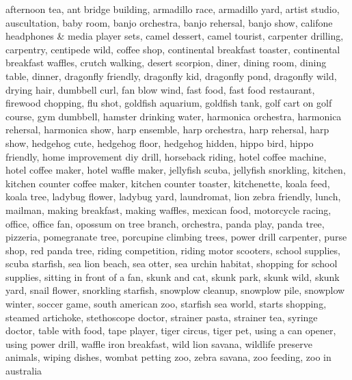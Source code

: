 \begin{appendices}
{\noindent 
afternoon tea, ant bridge building, armadillo race, armadillo yard, artist studio, auscultation, baby room, banjo orchestra, banjo rehersal, banjo show, califone headphones \& media player sets, camel dessert, camel tourist, carpenter drilling, carpentry, centipede wild, coffee shop, continental breakfast toaster, continental breakfast waffles, crutch walking, desert scorpion, diner, dining room, dining table, dinner, dragonfly friendly, dragonfly kid, dragonfly pond, dragonfly wild, drying hair, dumbbell curl, fan blow wind, fast food, fast food restaurant, firewood chopping, flu shot, goldfish aquarium, goldfish tank, golf cart on golf course, gym dumbbell, hamster drinking water, harmonica orchestra, harmonica rehersal, harmonica show, harp ensemble, harp orchestra, harp rehersal, harp show, hedgehog cute, hedgehog floor, hedgehog hidden, hippo bird, hippo friendly, home improvement diy drill, horseback riding, hotel coffee machine, hotel coffee maker, hotel waffle maker, jellyfish scuba, jellyfish snorkling, kitchen, kitchen counter coffee maker, kitchen counter toaster, kitchenette, koala feed, koala tree, ladybug flower, ladybug yard, laundromat, lion zebra friendly, lunch, mailman, making breakfast, making waffles, mexican food, motorcycle racing, office, office fan, opossum on tree branch, orchestra, panda play, panda tree, pizzeria, pomegranate tree, porcupine climbing trees, power drill carpenter, purse shop, red panda tree, riding competition, riding motor scooters, school supplies, scuba starfish, sea lion beach, sea otter, sea urchin habitat, shopping for school supplies, sitting in front of a fan, skunk and cat, skunk park, skunk wild, skunk yard, snail flower, snorkling starfish, snowplow cleanup, snowplow pile, snowplow winter, soccer game, south american zoo, starfish sea world, starts shopping, steamed artichoke, stethoscope doctor, strainer pasta, strainer tea, syringe doctor, table with food, tape player, tiger circus, tiger pet, using a can opener, using power drill, waffle iron breakfast, wild lion savana, wildlife preserve animals, wiping dishes, wombat petting zoo, zebra savana, zoo feeding, zoo in australia

}



\end{appendices}
